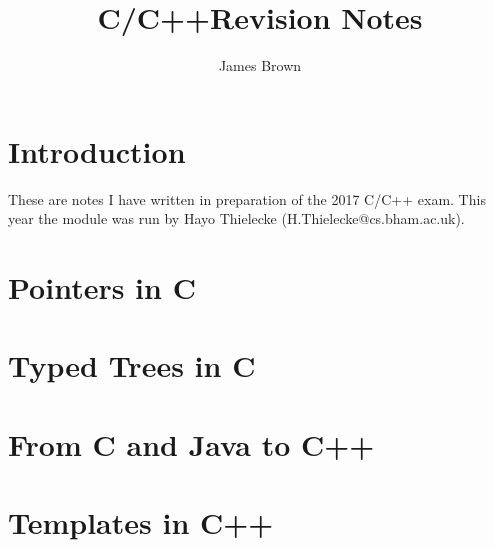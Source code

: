 \documentclass{article}
\title{C/C++\linebreak Revision Notes}
\author{James Brown}
\begin{document}
	\maketitle
	\newpage
	\tableofcontents
	\newpage

	\section{Introduction}
	These are notes I have written in preparation of the 2017 C/C++ exam. This year the module was run by Hayo Thielecke (H.Thielecke@cs.bham.ac.uk).
	\linebreak \linebreak
	
	\section{Pointers in C}
	
	\section{Typed Trees in C}

	\section{From C and Java to C++}
	
	\section{Templates in C++}
		
	\newpage
	\listoffigures
	\printindex
\end{document}
